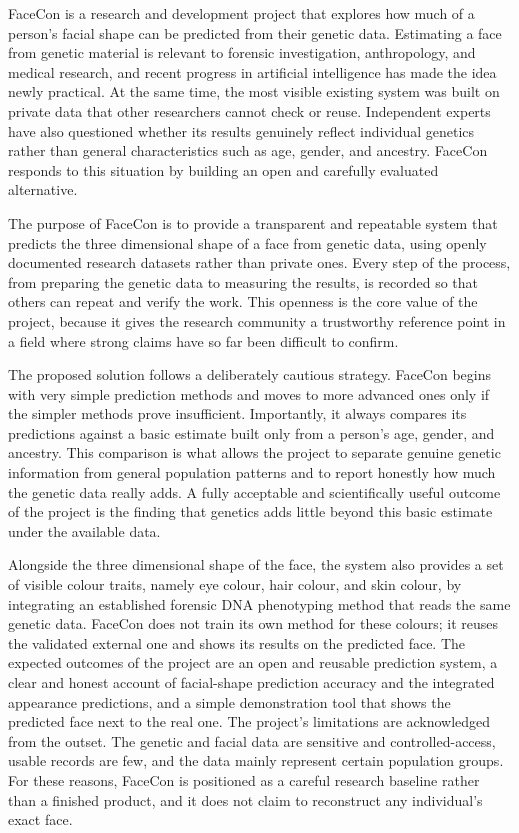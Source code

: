 FaceCon is a research and development project that explores how much of a person's facial shape can be predicted from their genetic data. Estimating a face from genetic material is relevant to forensic investigation, anthropology, and medical research, and recent progress in artificial intelligence has made the idea newly practical. At the same time, the most visible existing system was built on private data that other researchers cannot check or reuse. Independent experts have also questioned whether its results genuinely reflect individual genetics rather than general characteristics such as age, gender, and ancestry. FaceCon responds to this situation by building an open and carefully evaluated alternative.

The purpose of FaceCon is to provide a transparent and repeatable system that predicts the three dimensional shape of a face from genetic data, using openly documented research datasets rather than private ones. Every step of the process, from preparing the genetic data to measuring the results, is recorded so that others can repeat and verify the work. This openness is the core value of the project, because it gives the research community a trustworthy reference point in a field where strong claims have so far been difficult to confirm.

The proposed solution follows a deliberately cautious strategy. FaceCon begins with very simple prediction methods and moves to more advanced ones only if the simpler methods prove insufficient. Importantly, it always compares its predictions against a basic estimate built only from a person's age, gender, and ancestry. This comparison is what allows the project to separate genuine genetic information from general population patterns and to report honestly how much the genetic data really adds. A fully acceptable and scientifically useful outcome of the project is the finding that genetics adds little beyond this basic estimate under the available data.

Alongside the three dimensional shape of the face, the system also provides a set of visible colour traits, namely eye colour, hair colour, and skin colour, by integrating an established forensic DNA phenotyping method that reads the same genetic data. FaceCon does not train its own method for these colours; it reuses the validated external one and shows its results on the predicted face. The expected outcomes of the project are an open and reusable prediction system, a clear and honest account of facial-shape prediction accuracy and the integrated appearance predictions, and a simple demonstration tool that shows the predicted face next to the real one. The project's limitations are acknowledged from the outset. The genetic and facial data are sensitive and controlled-access, usable records are few, and the data mainly represent certain population groups. For these reasons, FaceCon is positioned as a careful research baseline rather than a finished product, and it does not claim to reconstruct any individual's exact face.

